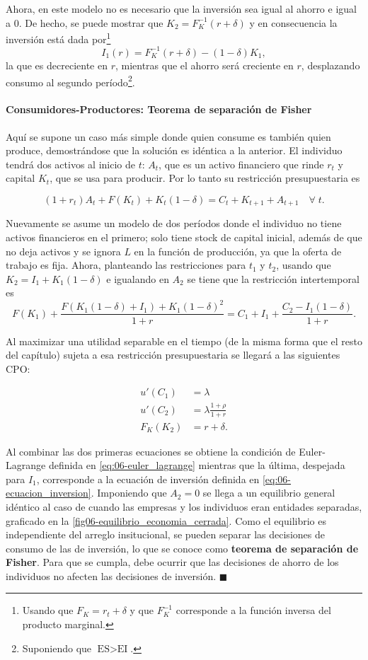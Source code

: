 \documentclass[DeGregorioResumen]{subfiles}
\begin{document}
Ahora, en este modelo no es necesario que la inversión sea igual al ahorro e igual a 0. De hecho, se puede mostrar que $K_2 = F_K^{-1}(r+\delta)$ y en consecuencia la inversión está dada por\footnote{Usando que $F_K=r_t+\delta$ y que $F_K^{-1}$ corresponde a la función inversa del producto marginal.}
\begin{equation}
	I_1(r) = F_K^{-1}(r+\delta) - (1-\delta)K_1,
	\label{eq:06-ecuacion_inversion}
\end{equation}
la que es decreciente en $r$, mientras que el ahorro será creciente en $r$, desplazando consumo al segundo período\footnote{Suponiendo que $\text{ES}>\text{EI}$.}.

\paragraph{Consumidores-Productores: Teorema de separación de Fisher}
Aquí se supone un caso más simple donde quien consume es también quien produce, demostrándose que la solución es idéntica a la anterior. El individuo tendrá dos activos al inicio de $t$: $A_t$, que es un activo financiero que rinde $r_t$ y capital $K_t$, que se usa para producir. Por lo tanto su restricción presupuestaria es

\[
(1+r_t)A_t + F(K_t) + K_t(1-\delta) = C_t + K_{t+1} + A_{t+1} \quad \forall \; t.
\]

Nuevamente se asume un modelo de dos períodos donde el individuo no tiene activos financieros en el primero; solo tiene stock de capital inicial, además de que no deja activos y se ignora $L$ en la función de producción, ya que la oferta de trabajo es fija. Ahora, planteando las restricciones para $t_1$ y $t_2$, usando que $K_2=I_1+K_1(1-\delta)$ e igualando en $A_2$ se tiene que la restricción intertemporal es
\[
	F(K_1) + \frac{F(K_1(1-\delta)+I_1)+K_1(1-\delta)^2}{1+r} = C_1 + I_1 + \frac{C_2-I_1(1-\delta)}{1+r}.
\]

Al maximizar una utilidad separable en el tiempo (de la misma forma que el resto del capítulo) sujeta a esa restricción presupuestaria se llegará a las siguientes CPO:

\begin{align*}
	u'(C_1) &= \lambda \\
	u'(C_2) &= \lambda \frac{1+\rho}{1+r} \\
	F_K(K_2) &= r+\delta.
\end{align*}

Al combinar las dos primeras ecuaciones se obtiene la condición de Euler-Lagrange definida en \eqref{eq:06-euler_lagrange} mientras que la última, despejada para $I_1$, corresponde a la ecuación de inversión definida en \eqref{eq:06-ecuacion_inversion}. Imponiendo que $A_2=0$ se llega a un equilibrio general idéntico al caso de cuando las empresas y los individuos eran entidades separadas, graficado en la \autoref{fig06-equilibrio_economia_cerrada}. Como el equilibrio es independiente del arreglo insitucional, se pueden separar las decisiones de consumo de las de inversión, lo que se conoce como \textbf{teorema de separación de Fisher}. Para que se cumpla, debe ocurrir que las decisiones de ahorro de los individuos no afecten las decisiones de inversión. $\blacksquare$
\end{document}
